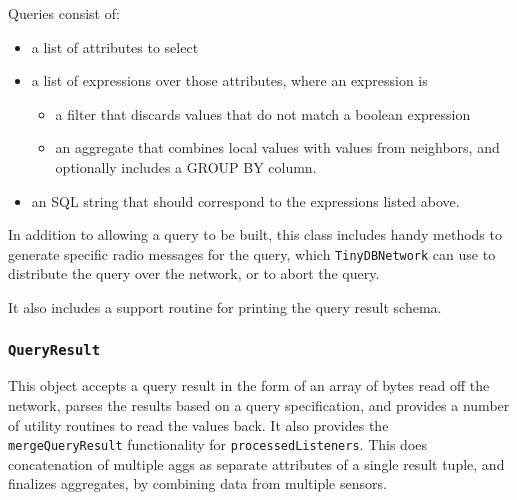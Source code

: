 \documentclass[11pt]{article}
\begin{document}
    Queries consist of:
    \begin{itemize}
    \item a list of attributes to select
    \item a list of expressions over those attributes, where an expression
    is
      \begin{itemize}
      \item a filter that discards values that do not match a
      boolean expression
      \item an aggregate that combines local values
        with values from
        neighbors, and optionally includes a GROUP
        BY column.  
      \end{itemize}
    \item an SQL string that should correspond to the expressions
    listed above.

    \end{itemize}

   In addition to allowing a query to be built, this class includes
   handy methods to generate specific radio messages for the query,
   which {\tt TinyDBNetwork} can use to distribute the query over the
   network, or to abort the query.

   It also includes a support routine for printing the query result
   schema.

\subsubsection{\tt QueryResult}
\label{sec:tinydbqueryresult}
This object accepts a query result in the
    form of an array of bytes read off the network, parses the results
    based on a query specification, and provides a number of utility
    routines to read the values back.  It also provides the {\tt
    mergeQueryResult} functionality for {\tt processedListeners}.
    This does concatenation of multiple aggs as separate attributes of
    a single result tuple, and finalizes aggregates, by
    combining data from multiple sensors.
\end{document}
